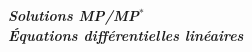 \documentclass[12pt]{article}
\begin{document}
\begin{titlepage}
	\centering
	\vspace*{\fill}
	\Huge \textit{\textbf{Solutions MP/MP$^*$\\ Équations différentielles linéaires}}
	\vspace*{\fill}
\end{titlepage}
\end{document}
